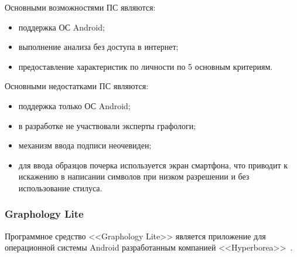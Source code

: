 Основными возможностями ПС являются:
\begin{itemize}
  \item поддержка ОС Android;
  \item выполнение анализа без доступа в интернет;
  \item предоставление характеристик по личности по 5 основным критериям.
\end{itemize}

Основными недостатками ПС являются:
\begin{itemize}
  \item поддержка только ОС Android;
  \item в разработке не участвовали эксперты графологи;
  \item механизм ввода подписи неочевиден;
  \item для ввода образцов почерка используется экран смартфона, что приводит к искажению в написании символов при низком разрешении и без использование стилуса.
\end{itemize}

\subsubsection{Graphology Lite}
\label{sub:domain:analogs:graphology_lite}

Программное средство <<Graphology Lite>> является приложение для операционной системы Android разработанным компанией <<Hyperborea>>~\cite{analogs_graphology_lite}.

